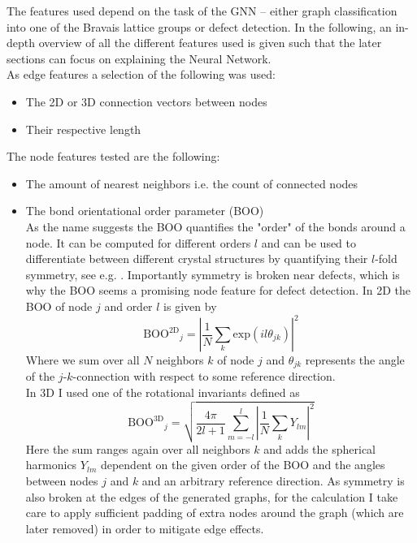 \documentclass[11pt,a4paper]{article}
\begin{document}
The features used depend on the task of the GNN -- either graph classification into one of the Bravais lattice groups or defect detection. 
In the following, an in-depth overview of all the different features used is given such that the later sections can focus on explaining the Neural Network. \\
As edge features a selection of the following was used: 
\begin{itemize}
\item The 2D or 3D connection vectors between nodes
\item Their respective length
\end{itemize}
The node features tested are the following:
\begin{itemize}
\item The amount of nearest neighbors i.e. the count of connected nodes
\item The bond orientational order parameter (BOO)\\
As the name suggests the BOO quantifies the "order" of the bonds around a node. 
It can be computed for different orders $l$ and can be used to differentiate between different crystal structures by quantifying their $l$-fold symmetry, see e.g. \cite{steinhardtBondorientationalOrderLiquids1983}. 
Importantly symmetry is broken near defects, which is why the BOO seems a promising node feature for defect detection. 
In 2D the BOO of node $j$ and order $l$ is given by
\begin{equation}
\label{eq:boo2d}
\mathrm{BOO^{2D}}_j = \left|\frac{1}{N} \sum_k \mathrm{exp}(il\theta_{jk}) \right|^2
\end{equation}
Where we sum over all $N$ neighbors $k$ of node $j$ and $\theta_{jk}$ represents the angle of the $j$-$k$-connection with respect to some reference direction. \\
In 3D I used one of the rotational invariants defined as 
\begin{equation}
\mathrm{BOO^{3D}}_j = \sqrt{\frac{4\pi}{2l+1} \sum_{m=-l}^{l} \left| \frac{1}{N} \sum_k Y_{lm}\right|^2}
\end{equation} 
Here the sum ranges again over all neighbors $k$ and adds the spherical harmonics $Y_{lm}$ dependent on the given order of the BOO and the angles between nodes $j$ and $k$ and an arbitrary reference direction. 
As symmetry is also broken at the edges of the generated graphs, for the calculation I take care to apply sufficient padding of extra nodes around the graph (which are later removed) in order to mitigate edge effects. 
\end{itemize}
\end{document}
